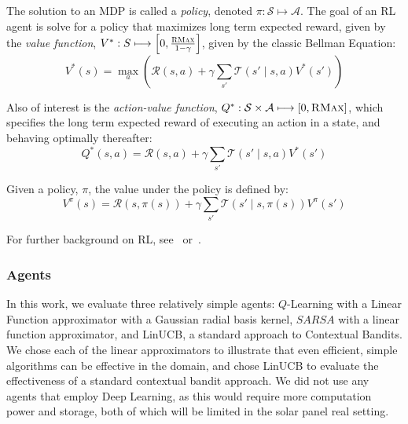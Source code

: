 \documentclass{article}
\newcommand{\mc}{\mathcal}
\begin{document}
The solution to an MDP is called a {\it policy}, denoted $\pi : \mc{S} \longmapsto \mc{A}$. The goal of an RL agent is solve for a policy that maximizes long term expected reward, given by the {\it value function}, $V^* : S \longmapsto \left[0,\frac{\textsc{RMax}}{1-\gamma}\right]$, given by the classic Bellman Equation:
\begin{equation}
V^*(s) = \max_a \left(\mc{R}(s,a) + \gamma \sum_{s'} \mc{T}(s' \mid s, a) V^*(s') \right)
\end{equation}

Also of interest is the {\it action-value function}, $Q^*: \mc{S} \times \mc{A} \longmapsto [0,\textsc{RMax}]$, which specifies the long term expected reward of executing an action in a state, and behaving optimally thereafter:
\begin{equation}
Q^*(s,a) = \mc{R}(s,a) + \gamma \sum_{s'} \mc{T}(s' \mid s,a) V^*(s')
\end{equation}

Given a policy, $\pi$, the value under the policy is defined by:
\begin{equation}
V^\pi(s) = \mc{R}(s, \pi(s)) + \gamma \sum_{s'} \mc{T}(s' \mid s, \pi(s)) V^\pi(s')
\end{equation}

For further background on RL, see~\citet{sutton1998reinforcement} or~\citet{kaelbling1996reinforcement}.

\subsubsection{Agents}
In this work, we evaluate three relatively simple agents: $Q$-Learning with a Linear Function approximator with a Gaussian radial basis kernel, $SARSA$ with a linear function approximator, and LinUCB, a standard approach to Contextual Bandits. We chose each of the linear approximators to illustrate that even efficient, simple algorithms can be effective in the domain, and chose LinUCB to evaluate the effectiveness of a standard contextual bandit approach. We did not use any agents that employ Deep Learning, as this would require more computation power and storage, both of which will be limited in the solar panel real setting. 
\end{document}
